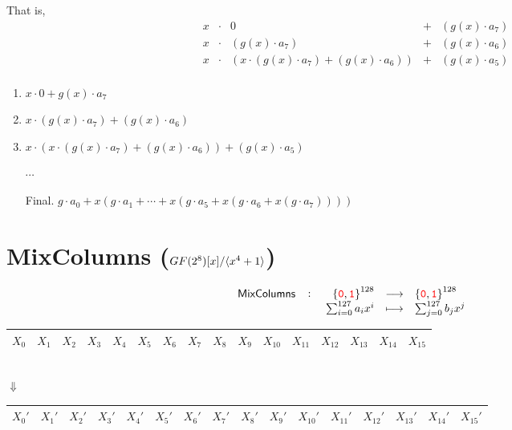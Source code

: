 That is, \begin{align*}
	&x &\cdot& 0 & + & (g(x)\cdot a_7)\\
	&x &\cdot& (g(x)\cdot a_7) & + & (g(x)\cdot a_6)\\
	&x &\cdot& (x\cdot (g(x)\cdot a_7) + (g(x)\cdot a_6)) & + & (g(x)\cdot a_5)\\
\end{align*}\begin{enumerate}[Step 1.]
	\item $x\cdot 0 + g(x)\cdot a_7$
	\item $x\cdot (g(x)\cdot a_7) + (g(x)\cdot a_6)$
	\item $x\cdot (x\cdot (g(x)\cdot a_7) + (g(x)\cdot a_6)) + (g(x)\cdot a_5)$
	\item[] $\cdots$
	\item[Final.] $g\cdot a_0 + x(g\cdot a_1 + \cdots + x(g\cdot a_5 + x(g\cdot a_6 + x(g\cdot a_7))))$
\end{enumerate}





\newpage

\section{MixColumns ($GF(2^8)[x]/\langle x^4+1 \rangle$)}
\[
\fullfunction{\textsf{MixColumns}}{\binaryfield^{128}}{\binaryfield^{128}}{\sum_{i=0}^{127}a_ix^i}{\sum_{j=0}^{127}b_jx^j}
\]

\begin{center}\begin{tabular}{|c|c|c|c|c|c|c|c|c|c|c|c|c|c|c|c|}\hline
	\cellcolor{red!20} $X_0$ & \cellcolor{red!20}$X_1$ & \cellcolor{red!20}$X_2$ & \cellcolor{red!20}$X_3$ & \cellcolor{green!20} $X_4$ & \cellcolor{green!20}$X_5$ & \cellcolor{green!20}$X_6$ & \cellcolor{green!20} $X_7$ & \cellcolor{blue!20} $X_8$ & \cellcolor{blue!20} $X_9$ & \cellcolor{blue!20} $X_{10}$ & \cellcolor{blue!20} $X_{11}$ & \cellcolor{yellow!20} $X_{12}$ & \cellcolor{yellow!20} $X_{13}$ & \cellcolor{yellow!20} $X_{14}$ & \cellcolor{yellow!20} $X_{15}$ \\ \hline
\end{tabular}\\
$\Downarrow$\\
\begin{tabular}{|c|c|c|c|c|c|c|c|c|c|c|c|c|c|c|c|}\hline
	\cellcolor{red!20} $X_0'$ & \cellcolor{red!20}$X_1'$ & \cellcolor{red!20}$X_2'$ & \cellcolor{red!20}$X_3'$ & \cellcolor{green!20} $X_4'$ & \cellcolor{green!20}$X_5'$ & \cellcolor{green!20}$X_6'$ & \cellcolor{green!20} $X_7'$ & \cellcolor{blue!20} $X_8'$ & \cellcolor{blue!20} $X_9'$ & \cellcolor{blue!20} $X_{10}'$ & \cellcolor{blue!20} $X_{11}'$ & \cellcolor{yellow!20} $X_{12}'$ & \cellcolor{yellow!20} $X_{13}'$ & \cellcolor{yellow!20} $X_{14}'$ & \cellcolor{yellow!20} $X_{15}'$ \\ \hline
\end{tabular}\\
\end{center}

